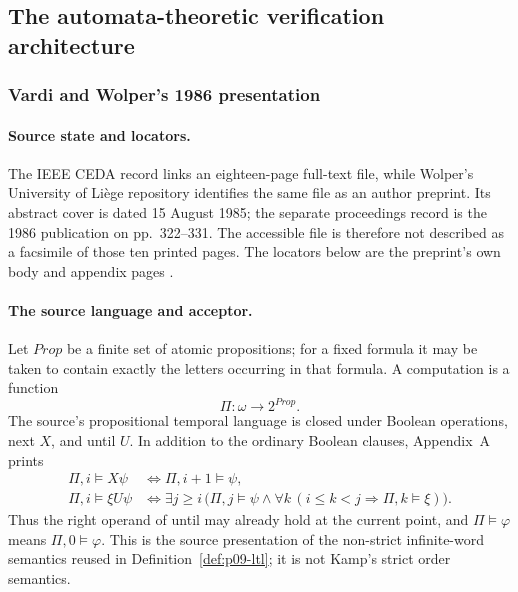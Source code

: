 
\subsection{The automata-theoretic verification architecture}
\label{sec:p09-presentation-n-c-013}

\subsubsection{Vardi and Wolper's 1986 presentation}

\paragraph{Source state and locators.}
The IEEE CEDA record links an eighteen-page full-text file, while Wolper's
University of Li\`ege repository identifies the same file as an author
preprint.  Its abstract cover is dated 15 August 1985; the separate
proceedings record is the 1986 publication on pp.~322--331.  The accessible
file is therefore not described as a facsimile of those ten printed pages.
The locators below are the preprint's own body and appendix pages
\cite{VardiWolper1986}.

\paragraph{The source language and acceptor.}
 Let \(\mathit{Prop}\) be a finite set of atomic propositions; for a fixed
 formula it may be taken to contain exactly the letters occurring in that
 formula.  A computation is a
function
\[
 \Pi:\omega\longrightarrow 2^{\mathit{Prop}}.
\]
The source's propositional temporal language is closed under Boolean
operations, next \(X\), and until \(U\).  In addition to the ordinary Boolean
clauses, Appendix~A prints
\[
\begin{aligned}
 \Pi,i\models X\psi
 &\Longleftrightarrow \Pi,i+1\models\psi,\\
 \Pi,i\models \xi U\psi
 &\Longleftrightarrow
   \exists j\ge i\,
   \bigl(\Pi,j\models\psi\land
         \forall k\,(i\le k<j\Rightarrow\Pi,k\models\xi)\bigr).
\end{aligned}
\]
Thus the right operand of until may already hold at the current point, and
\(\Pi\models\varphi\) means \(\Pi,0\models\varphi\).  This is the source
presentation of the non-strict infinite-word semantics reused in
Definition~\ref{def:p09-ltl}; it is not Kamp's strict order semantics.

